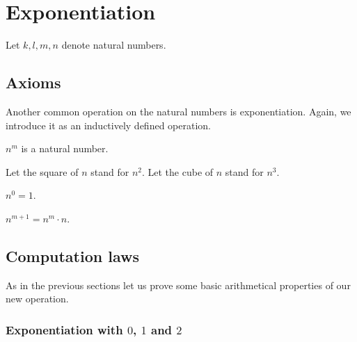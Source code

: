\documentclass[../../arithmetic.ftl.tex]{subfiles}
\begin{document}
  \section{Exponentiation}

  \begin{forthel}
  \end{forthel}

  \begin{forthel}
    Let $k, l, m, n$ denote natural numbers.
  \end{forthel}


  \subsection{Axioms}

  Another common operation on the natural numbers is exponentiation.
  Again, we introduce it as an inductively defined operation.

  \begin{forthel}
    \begin{signature}
      $n^{m}$ is a natural number.
    \end{signature}

    Let the square of $n$ stand for $n^{2}$.
    Let the cube of $n$ stand for $n^{3}$.

    \begin{axiom}\label{Arithmetic_01_04_316593}
      $n^{0} = 1$.
    \end{axiom}

    \begin{axiom}\label{Arithmetic_01_04_312242}
      $n^{m + 1} = n^{m} \cdot n$.
    \end{axiom}
  \end{forthel}


  \subsection{Computation laws}

  As in the previous sections let us prove some basic arithmetical properties of
  our new operation.


  \subsubsection*{Exponentiation with $0$, $1$ and $2$}
\end{document}
